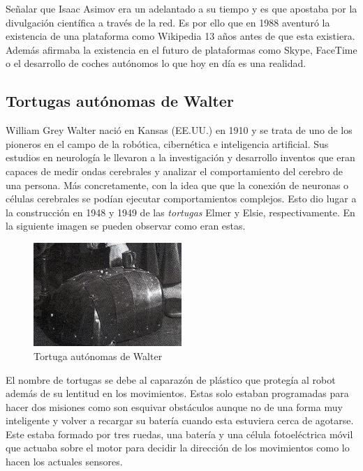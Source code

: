 Señalar que Isaac Asimov era un adelantado a su tiempo y es que apostaba por la divulgación científica a través de la red. Es por ello que en 1988 aventuró la existencia de una plataforma como Wikipedia 13 años antes de que esta existiera. Además afirmaba la existencia en el futuro de plataformas como Skype, FaceTime o el desarrollo de coches autónomos lo que hoy en día es una realidad.



\subsection{Tortugas autónomas de Walter}

William Grey Walter nació en Kansas (EE.UU.) en 1910 y se trata de uno de los pioneros en el campo de la robótica, cibernética e inteligencia artificial. Sus estudios en neurología le llevaron a la investigación y desarrollo inventos que eran capaces de medir ondas cerebrales y analizar el comportamiento del cerebro de una persona. Más concretamente, con la idea que que la conexión de neuronas o células cerebrales se podían ejecutar comportamientos complejos. Esto dio lugar a la construcción en 1948 y 1949 de las \textit{tortugas} Elmer y Elsie, respectivamente. En la siguiente imagen se pueden observar como eran estas.

\begin{figure}[H]
\begin{center}
  \includegraphics[width=0.5\textwidth]{./EtapaPrimeriza/imagenes/tortuga.jpg}
  \caption{Tortuga autónomas de Walter}
  \label{tortuga}
\end{center}
\end{figure}

El nombre de tortugas se debe al caparazón de plástico que protegía al robot además de su lentitud en los movimientos. Estas solo estaban programadas para hacer dos misiones como son esquivar obstáculos aunque no de una forma muy inteligente y volver a recargar su batería cuando esta estuviera cerca de agotarse. Este estaba formado por tres ruedas, una batería y una célula fotoeléctrica móvil que actuaba sobre el motor para decidir la dirección de los movimientos como lo hacen los actuales sensores.

